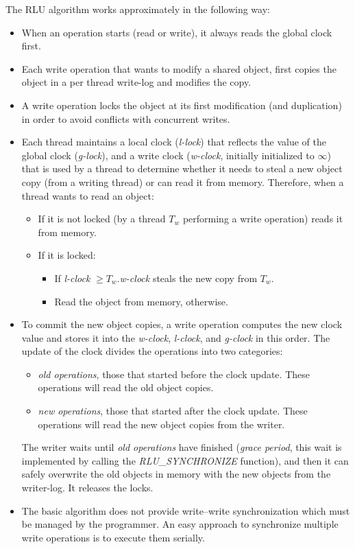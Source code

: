 \begin{refsection}
\noindent
The RLU algorithm works approximately in the following way:

\begin{itemize}
\item When an operation starts (read or write), it always reads the global
  clock first.
\item Each write operation that wants to modify a shared object, first copies
  the object in a per thread write-log and modifies the copy.
\item A write operation locks the object at its first modification (and
  duplication) in order to avoid conflicts with concurrent writes.
\item Each thread maintains a local clock (\emph{l-lock}) that reflects the
  value of the global clock (\emph{g-lock}), and a write clock
  (\emph{w-clock}, initially initialized to $\infty$) that is used by a thread
  to determine whether it needs to steal a new object copy (from a writing
  thread) or can read it from memory.
  Therefore, when a thread wants to read an object:
  \begin{itemize}
  \item If it is not locked (by a thread $T_w$ performing a write operation)
    reads it from memory.
  \item If it is locked:
    \begin{itemize}
    \item If \emph{l-clock} $\geq T_w$.\emph{w-clock} steals the new copy from $T_w$.
    \item Read the object from memory, otherwise.
    \end{itemize}
  \end{itemize}
\item To commit the new object copies, a write operation computes the new
  clock value and stores it into the \emph{w-clock}, \emph{l-clock}, and
  \emph{g-clock} in this order.
  The update of the clock divides the operations into two categories:
  \begin{itemize}
  \item \emph{old operations}, those that started before the clock update.
    These operations will read the old object copies.
  \item \emph{new operations}, those that started after the clock update.
    These operations will read the new object copies from the writer.
  \end{itemize}
  The writer waits until \emph{old operations} have finished (\emph{grace
    period}, this wait is implemented by calling the \emph{RLU\_SYNCHRONIZE}
  function), and then it can safely overwrite the old objects in memory with
  the new objects from the writer-log.
  It releases the locks.
  \item The basic algorithm does not provide write--write synchronization which must
    be managed by the programmer.
    An easy approach to synchronize multiple write operations is to execute them
    serially.
\end{itemize}


\end{refsection}
